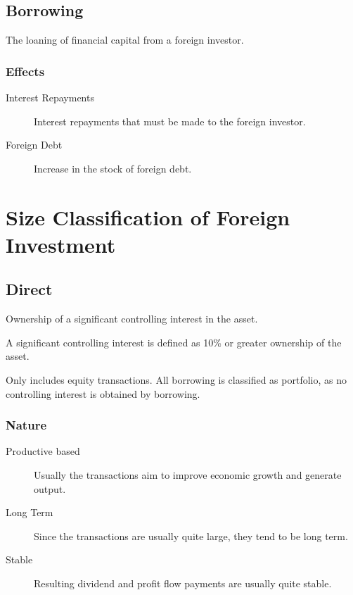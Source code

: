 \documentclass[a4paper,11pt]{report}
\begin{document}
\subsection{Borrowing}

The loaning of financial capital from a foreign investor.

\subsubsection{Effects}

\begin{description}
\item [Interest Repayments] Interest repayments that must be made to the
	foreign investor.
\item [Foreign Debt] Increase in the stock of foreign debt.
\end{description}


\section{Size Classification of Foreign Investment}

\subsection{Direct}

Ownership of a significant controlling interest in the asset.

A significant controlling interest is defined as 10\% or greater ownership of
the asset.

Only includes equity transactions. All borrowing is classified as portfolio, as
no controlling interest is obtained by borrowing.

\subsubsection{Nature}

\begin{description}
\item [Productive based] Usually the transactions aim to improve economic
	growth and generate output.
\item [Long Term] Since the transactions are usually quite large, they tend to
	be long term.
\item [Stable] Resulting dividend and profit flow payments are usually quite
	stable.
\end{description}
\end{document}
